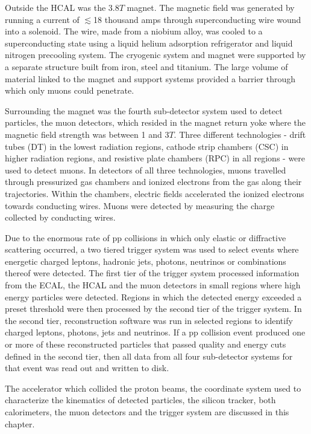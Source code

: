 Outside the HCAL was the 3.8$\unit{T}$ magnet.  The magnetic field was generated by running a current of 
$\lesssim$18 thousand amps through superconducting wire wound into a solenoid.  The wire, made from a niobium alloy, was 
cooled to a superconducting state using a liquid helium adsorption refrigerator and liquid nitrogen precooling 
system.  The cryogenic system and magnet were supported by a separate structure built from iron, steel and titanium.  The
large volume of material linked to the magnet and support systems provided a barrier through which only muons 
could penetrate.

Surrounding the magnet was the fourth sub-detector system used to detect particles, the muon detectors, which resided 
in the magnet return yoke where the magnetic field strength was between 1 and 3$\unit{T}$.  Three 
different technologies - drift tubes (DT) in the lowest radiation regions, cathode strip chambers (CSC) in higher 
radiation regions, and resistive plate chambers (RPC) in all regions - were used to detect muons.  In detectors of all 
three technologies, muons travelled through pressurized gas chambers and ionized electrons from the gas along their 
trajectories.  Within the chambers, electric fields accelerated the ionized electrons towards conducting wires.  Muons 
were detected by measuring the charge collected by conducting wires.

Due to the enormous rate of pp collisions in which only elastic or diffractive scattering occurred, a two tiered trigger 
system was used to select events where energetic charged leptons, hadronic jets, photons, neutrinos or combinations 
thereof were detected.  The first tier of the trigger system processed information from the ECAL, the HCAL and the muon 
detectors in small regions where high energy particles were detected.  Regions in which the detected energy exceeded 
a preset threshold were then processed by the second tier of the trigger system.  In the second tier, reconstruction software 
was run in selected regions to identify charged leptons, photons, jets and neutrinos.  If a pp collision event produced one 
or more of these reconstructed particles that passed quality and energy cuts defined in the second tier, then all data 
from all four sub-detector systems for that event was read out and written to disk.

The accelerator which collided the proton beams, the coordinate system used to characterize the kinematics of detected 
particles, the silicon tracker, both calorimeters, the muon detectors and the trigger system are discussed in this chapter.

